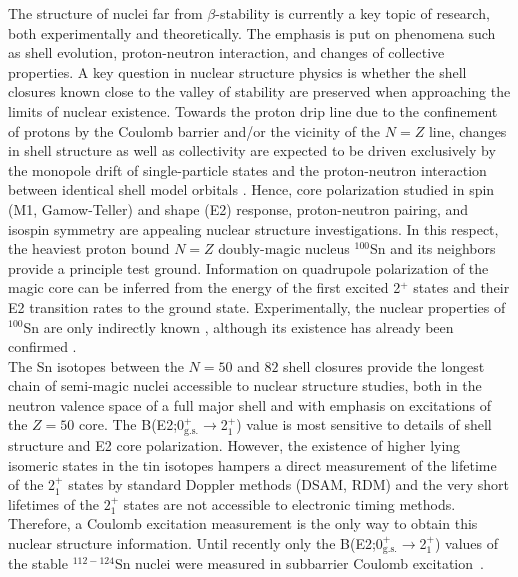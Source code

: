 \documentclass[prc,twocolumn,amssymb,amsmath,showpacs,superscriptaddress]{revtex4}
\begin{document}
The structure of nuclei far from $\beta$-stability is currently a
key topic of research, both experimentally and theoretically. The
emphasis is put on phenomena such as shell evolution,
proton-neutron interaction, and changes of collective properties.
A key question in nuclear structure physics is whether the shell
closures known close to the valley of stability are preserved when
approaching the limits of nuclear existence. Towards the proton
drip line due to the confinement of protons by the Coulomb barrier
and/or the vicinity of the $N=Z$ line, changes in shell structure
as well as collectivity are expected to be driven exclusively by
the monopole drift \cite{ots01,gra04} of single-particle states
and the proton-neutron interaction between identical shell model
orbitals \cite{naz95}. Hence, core polarization studied in spin
(M1, Gamow-Teller) and shape (E2) response, proton-neutron
pairing, and isospin symmetry are appealing nuclear structure
investigations. In this respect, the heaviest proton bound $N=Z$
doubly-magic nucleus $^{100}$Sn and its neighbors provide a
principle test ground. Information on quadrupole polarization of
the magic core can be inferred from the energy of the first
excited 2$^+$ states and their E2 transition rates to the ground
state. Experimentally, the nuclear properties of $^{100}$Sn are
only indirectly known \cite{gor97,gor98,lip98,bla04}, although its
existence has already been confirmed \cite{lew94,sch94}. \\
The Sn isotopes between the $N=50$ and $82$ shell closures provide
the longest chain of semi-magic nuclei accessible to nuclear
structure studies, both in the neutron valence space of a full
major shell and with emphasis on excitations of the $Z=50$ core.
The B(E2;0$^+_{\text{g.s.}}$$\to$2$^+_1$) value is most sensitive
to details of shell structure and E2 core polarization. However,
the existence of higher lying isomeric states in the tin isotopes
hampers a direct measurement of the lifetime of the $2^{+}_{1}$
states by standard Doppler methods (DSAM, RDM) and the very short
lifetimes of the $2^{+}_{1}$ states are not accessible to
electronic timing methods. Therefore, a Coulomb excitation
measurement is the only way to obtain this nuclear structure
information. Until recently only the
B(E2;0$^+_{\text{g.s.}}$$\to$2$^+_1$) values of the stable
$^{112-124}$Sn nuclei were measured in subbarrier Coulomb
excitation~\cite{ram01}.
\end{document}
